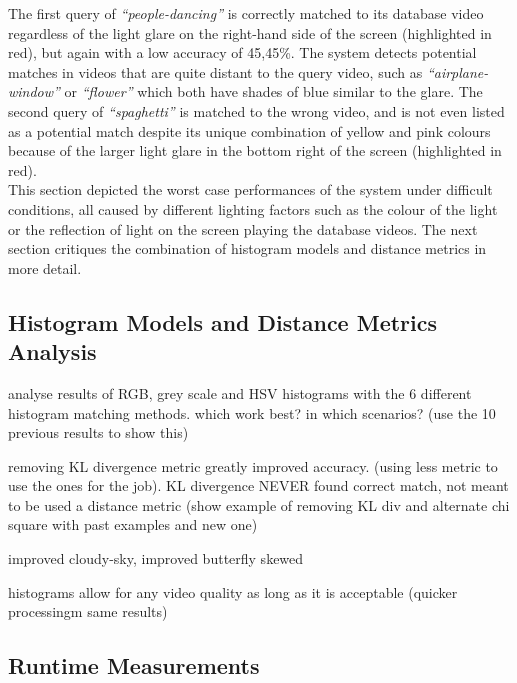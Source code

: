The first query of \textit{``people-dancing''} is correctly matched to its database video regardless of the light glare on the right-hand side of the screen (highlighted in red), but again with a low accuracy of 45,45\%. The system detects potential matches in videos that are quite distant to the query video, such as \textit{``airplane-window''} or \textit{``flower''} which both have shades of blue similar to the glare. The second query of \textit{``spaghetti''} is matched to the wrong video, and is not even listed as a potential match despite its unique combination of yellow and pink colours because of the larger light glare in the bottom right of the screen (highlighted in red).\\

This section depicted the worst case performances of the system under difficult conditions, all caused by different lighting factors such as the colour of the light or the reflection of light on the screen playing the database videos. The next section critiques the combination of histogram models and distance metrics in more detail.


\subsection{Histogram Models and Distance Metrics Analysis}

analyse results of RGB, grey scale and HSV histograms with the 6 different histogram matching methods. which work best? in which scenarios? (use the 10 previous results to show this)

removing KL divergence metric greatly improved accuracy. (using less metric to use the ones for the job). KL divergence NEVER found correct match, not meant to be used a distance metric (show example of removing KL div and alternate chi square with past examples and new one)

improved cloudy-sky,
improved butterfly skewed

histograms allow for any video quality as long as it is acceptable (quicker processingm same results)


\subsection{Runtime Measurements}

